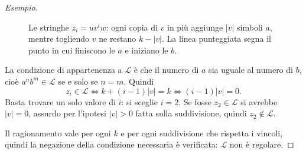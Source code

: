 \documentclass[a4paper, 11pt, oneside]{book}
\theoremstyle{formale}
\newenvironment{esempio}
    {\begin{proof}[\textit{Esempio}]\renewcommand{\qedsymbol}{$\diamond$}}
    {\end{proof}}
\begin{document}
\begin{esempio}
\begin{figure}[H]
            \caption{Le stringhe $z_i = uv^i w$: ogni copia di $v$ in pi\`u aggiunge $|v|$
                simboli $a$, mentre togliendo $v$ ne restano $k - |v|$. La linea
                punteggiata segna il punto in cui finiscono le $a$ e iniziano le $b$.}
            \label{fig:anbn-pompate}
        \end{figure}

        La condizione di appartenenza a $\mathcal{L}$ \`e che il numero di $a$ sia uguale
        al numero di $b$, cio\`e $a^n b^m \in \mathcal{L}$ se e solo se $n = m$. Quindi
        \begin{equation*}
            z_i \in \mathcal{L}
            \iff k + (i - 1)|v| = k
            \iff (i - 1)|v| = 0.
        \end{equation*}
        Basta trovare un solo valore di $i$: si sceglie $i = 2$. Se fosse
        $z_2 \in \mathcal{L}$ si avrebbe $|v| = 0$, assurdo per l'ipotesi $|v| > 0$ fatta
        sulla suddivisione, quindi $z_2 \notin \mathcal{L}$.

        Il ragionamento vale per ogni $k$ e per ogni suddivisione che rispetta i vincoli,
        quindi la negazione della condizione necessaria \`e verificata: $\mathcal{L}$
        non \`e regolare.
    \end{esempio}
\end{document}
